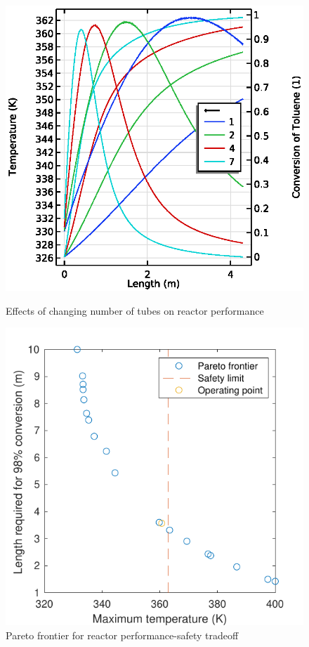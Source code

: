 \begin{figure}[h]
    \begin{minipage}[t]{0.45\linewidth}
        \includegraphics[width=\linewidth]{figures/S5-T-X.eps}
        \caption{Effects of changing number of tubes on reactor performance}
        \label{fig:S5-T-X}
    \end{minipage}\hfill
    \begin{minipage}[t]{0.45\linewidth}
        \includegraphics[width=\linewidth]{figures/comsol-pareto.pdf}
        \caption{Pareto frontier for reactor performance-safety tradeoff}
        \label{fig:comsol-pareto}
    \end{minipage}\hfill
\end{figure}

